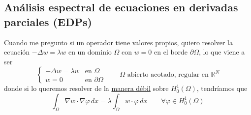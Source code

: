 \subsection{Análisis espectral de ecuaciones en derivadas parciales (EDPs)}

\noindent
Cuando me pregunto si un operador tiene valores propios, quiero resolver la ecuación $-\Delta w = \lambda w$ en un dominio $\Omega$ con $w=0$ en el borde $\partial\Omega$, lo que viene a ser
\begin{equation*}
    \begin{cases} -\Delta w = \lambda w & \text{en } \Omega \\ w = 0 & \text{en } \partial\Omega \end{cases} \qquad \Omega \text{ abierto acotado, regular en } \mathbb{R}^N
\end{equation*}
donde si lo queremos resolver de la \underline{manera débil} sobre $H_0^1(\Omega)$, tendríamos que
\begin{equation*}
    \int_{\Omega} \nabla w \cdot \nabla \varphi \, dx = \lambda \int_{\Omega} w \cdot \varphi \, dx \qquad \forall \varphi \in H_0^1(\Omega)
\end{equation*}

